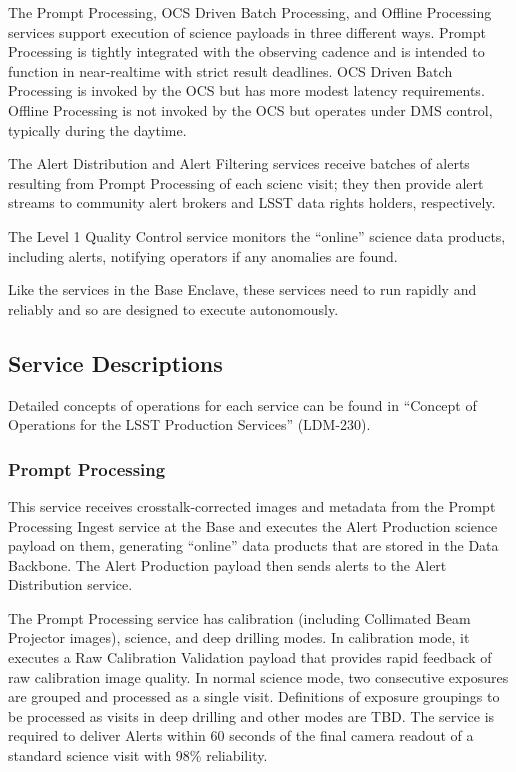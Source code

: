 \documentclass[]{article}
\begin{document}
The Prompt Processing, OCS Driven Batch Processing, and Offline
Processing services support execution of science payloads in three
different ways. Prompt Processing is tightly integrated with the
observing cadence and is intended to function in near-realtime with
strict result deadlines. OCS Driven Batch Processing is invoked by the
OCS but has more modest latency requirements. Offline Processing is not
invoked by the OCS but operates under DMS control, typically during the
daytime.

The Alert Distribution and Alert Filtering services receive batches of
alerts resulting from Prompt Processing of each scienc visit; they then
provide alert streams to community alert brokers and LSST data rights
holders, respectively.

The Level 1 Quality Control service monitors the ``online'' science data
products, including alerts, notifying operators if any anomalies are
found.

Like the services in the Base Enclave, these services need to run
rapidly and reliably and so are designed to execute autonomously.

\subsection{Service Descriptions}\label{service-descriptions-1}

Detailed concepts of operations for each service can be found in
``Concept of Operations for the LSST Production Services'' (LDM-230).

\subsubsection{Prompt Processing}\label{prompt-processing}

This service receives crosstalk-corrected images and metadata from the
Prompt Processing Ingest service at the Base and executes the Alert
Production science payload on them, generating ``online'' data products
that are stored in the Data Backbone. The Alert Production payload then
sends alerts to the Alert Distribution service.

The Prompt Processing service has calibration (including Collimated Beam
Projector images), science, and deep drilling modes. In calibration
mode, it executes a Raw Calibration Validation payload that provides
rapid feedback of raw calibration image quality. In normal science mode,
two consecutive exposures are grouped and processed as a single visit.
Definitions of exposure groupings to be processed as visits in deep
drilling and other modes are TBD. The service is required to deliver
Alerts within 60 seconds of the final camera readout of a standard
science visit with 98\% reliability.
\end{document}
